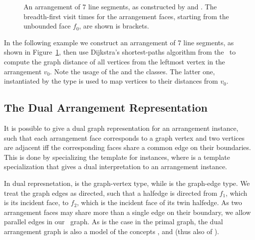\begin{figure}[!htp]
\begin{ccTexOnly}
  \begin{center}
  
  \end{center}
\end{ccTexOnly}
\begin{ccHtmlOnly}
\end{ccHtmlOnly}
\caption{An arrangement of 7 line segments, as constructed by
 and .
The breadth-first visit times for the arrangement faces, starting
from the unbounded face $f_0$, are shown is brackets.}
\label{arr_fig:ex_bgl}
\end{figure}

In the following example we construct an arrangement of 7 line segments,
as shown in Figure~\ref{arr_fig:ex_bgl},
then use Dijkstra's shortest-paths algorithm from the \bgl\ to compute
the graph distance of all vertices from the leftmost vertex in the
arrangement $v_0$. Note the usage of the  and
the  classes. The latter one, instantiated by
the type  is used to map vertices to their distances from $v_0$.


\subsection{The Dual Arrangement Representation}
\label{arr_ssec:bgl_dual}

It is possible to give a dual graph representation for an arrangement instance,
such that each arrangement face corresponds to a graph vertex and two vertices
are adjacent iff the corresponding faces share a common edge on their
boundaries. This is done by specializing the
 template for  instances,
where  is a template specialization that gives a
dual interpretation to an arrangement instance.

In dual represnetation, 
is the graph-vertex type, while  is the
graph-edge type. We treat the graph edges as directed, such that a halfedge
 is directed from $f_1$, which is its incident face, to $f_2$, which
is the incident face of its twin halfedge. As two arrangement faces may
share more than a single edge on their boundary, we allow parallel
edges in our \boost\ graph. As is the case in the primal graph, the dual
arrangement graph is also a model of the concepts ,
 and  (thus also of 
).

